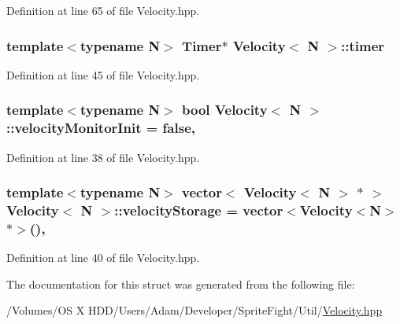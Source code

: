 Definition at line 65 of file Velocity.\-hpp.

\hypertarget{struct_velocity_a99f61fd4486ecad5fdbf0c8d3da8c4a0}{
\subsubsection[{timer}]{\setlength{\rightskip}{0pt plus 5cm}template$<$typename N$>$ {\bf Timer}$\ast$ {\bf Velocity}$<$ N $>$\-::timer\hspace{0.3cm}{\ttfamily [protected]}}}\label{struct_velocity_a99f61fd4486ecad5fdbf0c8d3da8c4a0}


Definition at line 45 of file Velocity.\-hpp.

\hypertarget{struct_velocity_a014fe36081e4170fc42b605048c6086c}{
\subsubsection[{velocity\-Monitor\-Init}]{\setlength{\rightskip}{0pt plus 5cm}template$<$typename N$>$ bool {\bf Velocity}$<$ N $>$\-::velocity\-Monitor\-Init = false\hspace{0.3cm}{\ttfamily [static]}, {\ttfamily [protected]}}}\label{struct_velocity_a014fe36081e4170fc42b605048c6086c}


Definition at line 38 of file Velocity.\-hpp.

\hypertarget{struct_velocity_a3815a4870a3cb81cf239d58e84eb9284}{
\subsubsection[{velocity\-Storage}]{\setlength{\rightskip}{0pt plus 5cm}template$<$typename N$>$ vector$<$ {\bf Velocity}$<$ N $>$ $\ast$ $>$ {\bf Velocity}$<$ N $>$\-::velocity\-Storage = vector$<${\bf Velocity}$<$N$>$ $\ast$$>$()\hspace{0.3cm}{\ttfamily [static]}, {\ttfamily [protected]}}}\label{struct_velocity_a3815a4870a3cb81cf239d58e84eb9284}


Definition at line 40 of file Velocity.\-hpp.



The documentation for this struct was generated from the following file\-:\begin{DoxyCompactItemize}
\item 
/\-Volumes/\-O\-S X H\-D\-D/\-Users/\-Adam/\-Developer/\-Sprite\-Fight/\-Util/\hyperlink{_velocity_8hpp}{Velocity.\-hpp}\end{DoxyCompactItemize}
